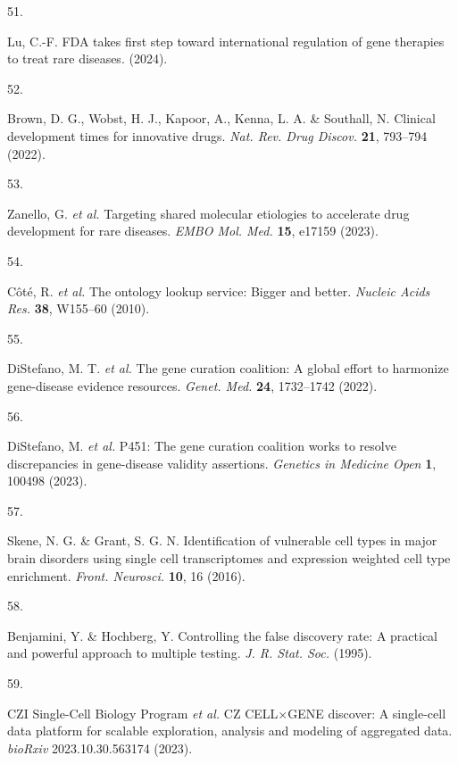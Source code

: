 \documentclass[
]{article}
\newlength{\cslhangindent}
\newlength{\csllabelwidth}
\newenvironment{CSLReferences}[2] %
 {\begin{list}{}{%
  \setlength{\itemindent}{0pt}
  \setlength{\leftmargin}{0pt}
  \setlength{\parsep}{0pt}
  \ifodd #1
   \setlength{\leftmargin}{\cslhangindent}
   \setlength{\itemindent}{-1\cslhangindent}
  \fi
  \setlength{\itemsep}{#2\baselineskip}}}
 {\end{list}}
\newcommand{\CSLLeftMargin}[1]{\parbox[t]{\csllabelwidth}{\strut#1\strut}}
\newcommand{\CSLRightInline}[1]{\parbox[t]{\linewidth - \csllabelwidth}{\strut#1\strut}}
\begin{document}
\begin{CSLReferences}{0}{0}
\CSLLeftMargin{51. }%
\CSLRightInline{Lu, C.-F. {FDA} takes first step toward international
regulation of gene therapies to treat rare diseases. (2024).}

\CSLLeftMargin{52. }%
\CSLRightInline{Brown, D. G., Wobst, H. J., Kapoor, A., Kenna, L. A. \&
Southall, N. Clinical development times for innovative drugs. \emph{Nat.
Rev. Drug Discov.} \textbf{21}, 793--794 (2022).}

\CSLLeftMargin{53. }%
\CSLRightInline{Zanello, G. \emph{et al.} Targeting shared molecular
etiologies to accelerate drug development for rare diseases. \emph{EMBO
Mol. Med.} \textbf{15}, e17159 (2023).}

\CSLLeftMargin{54. }%
\CSLRightInline{Côté, R. \emph{et al.} The ontology lookup service:
Bigger and better. \emph{Nucleic Acids Res.} \textbf{38}, W155--60
(2010).}

\CSLLeftMargin{55. }%
\CSLRightInline{DiStefano, M. T. \emph{et al.} The gene curation
coalition: A global effort to harmonize gene-disease evidence resources.
\emph{Genet. Med.} \textbf{24}, 1732--1742 (2022).}

\CSLLeftMargin{56. }%
\CSLRightInline{DiStefano, M. \emph{et al.} P451: The gene curation
coalition works to resolve discrepancies in gene-disease validity
assertions. \emph{Genetics in Medicine Open} \textbf{1}, 100498 (2023).}

\CSLLeftMargin{57. }%
\CSLRightInline{Skene, N. G. \& Grant, S. G. N. Identification of
vulnerable cell types in major brain disorders using single cell
transcriptomes and expression weighted cell type enrichment.
\emph{Front. Neurosci.} \textbf{10}, 16 (2016).}

\CSLLeftMargin{58. }%
\CSLRightInline{Benjamini, Y. \& Hochberg, Y. Controlling the false
discovery rate: A practical and powerful approach to multiple testing.
\emph{J. R. Stat. Soc.} (1995).}

\CSLLeftMargin{59. }%
\CSLRightInline{CZI Single-Cell Biology Program \emph{et al.} {CZ}
{CELL\(\times\)GENE} discover: A single-cell data platform for scalable
exploration, analysis and modeling of aggregated data. \emph{bioRxiv}
2023.10.30.563174 (2023).}


\end{CSLReferences}
\end{document}
